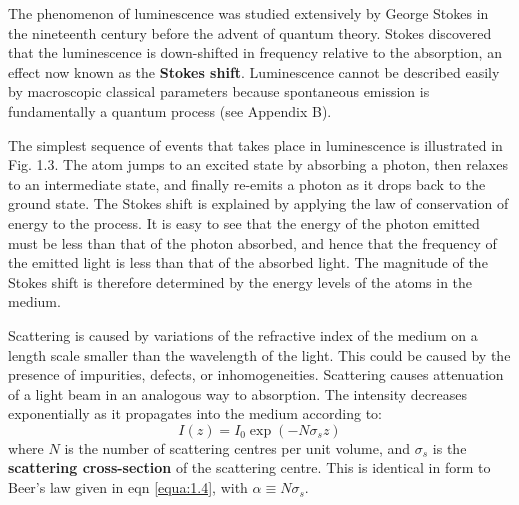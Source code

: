 \documentclass[12pt]{book}
\begin{document}
The phenomenon of luminescence was studied extensively by George Stokes in the nineteenth century before the advent of quantum theory. Stokes discovered that the luminescence is down-shifted in frequency relative to the absorption, an effect now known as the \textbf{Stokes shift}. Luminescence cannot be described easily by macroscopic classical parameters because spontaneous emission is fundamentally a quantum process (see Appendix B).

The simplest sequence of events that takes place in luminescence is illustrated in Fig. 1.3. The atom jumps to an excited state by absorbing a photon, then relaxes to an intermediate state, and finally re-emits a photon as it drops back to the ground state. The Stokes shift is explained by applying the law of conservation of energy to the process. It is easy to see that the energy of the photon emitted must be less than that of the photon absorbed, and hence that the frequency of the emitted light is less than that of the absorbed light. The magnitude of the Stokes shift is therefore determined by the energy levels of the atoms in the medium.


Scattering is caused by variations of the refractive index of the medium on a length scale smaller than the wavelength of the light. This could be caused by the presence of impurities, defects, or inhomogeneities. Scattering causes attenuation of a light beam in an analogous way to absorption. The intensity decreases exponentially as it propagates into the medium according to:
\begin{equation}\label{equa:1.9}
  I(z)=I_0\exp(-N\sigma_sz)
\end{equation}
where $N$ is the number of scattering centres per unit volume, and $\sigma_s$ is the \textbf{scattering cross-section} of the scattering centre. This is identical in form to Beer's law given in eqn \ref{equa:1.4}, with $\alpha\equiv N\sigma_s$.
\end{document}
